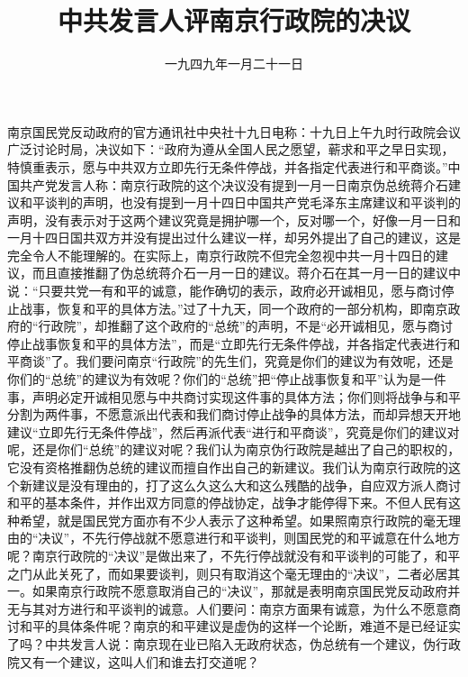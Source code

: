 
\title{中共发言人评南京行政院的决议}
\date{一九四九年一月二十一日}
\maketitle


南京国民党反动政府的官方通讯社中央社十九日电称：十九日上午九时行政院会议广泛讨论时局，决议如下：“政府为遵从全国人民之愿望，蕲求和平之早日实现，特慎重表示，愿与中共双方立即先行无条件停战，并各指定代表进行和平商谈。”中国共产党发言人称：南京行政院的这个决议没有提到一月一日南京伪总统蒋介石建议和平谈判的声明，也没有提到一月十四日中国共产党毛泽东主席建议和平谈判的声明，没有表示对于这两个建议究竟是拥护哪一个，反对哪一个，好像一月一日和一月十四日国共双方并没有提出过什么建议一样，却另外提出了自己的建议，这是完全令人不能理解的。在实际上，南京行政院不但完全忽视中共一月十四日的建议，而且直接推翻了伪总统蒋介石一月一日的建议。蒋介石在其一月一日的建议中说：“只要共党一有和平的诚意，能作确切的表示，政府必开诚相见，愿与商讨停止战事，恢复和平的具体方法。”过了十九天，同一个政府的一部分机构，即南京政府的“行政院”，却推翻了这个政府的“总统”的声明，不是“必开诚相见，愿与商讨停止战事恢复和平的具体方法”，而是“立即先行无条件停战，并各指定代表进行和平商谈”了。我们要问南京“行政院”的先生们，究竟是你们的建议为有效呢，还是你们的“总统”的建议为有效呢？你们的“总统”把“停止战事恢复和平”认为是一件事，声明必定开诚相见愿与中共商讨实现这件事的具体方法；你们则将战争与和平分割为两件事，不愿意派出代表和我们商讨停止战争的具体方法，而却异想天开地建议“立即先行无条件停战”，然后再派代表“进行和平商谈”，究竟是你们的建议对呢，还是你们“总统”的建议对呢？我们认为南京伪行政院是越出了自己的职权的，它没有资格推翻伪总统的建议而擅自作出自己的新建议。我们认为南京行政院的这个新建议是没有理由的，打了这么久这么大和这么残酷的战争，自应双方派人商讨和平的基本条件，并作出双方同意的停战协定，战争才能停得下来。不但人民有这种希望，就是国民党方面亦有不少人表示了这种希望。如果照南京行政院的毫无理由的“决议”，不先行停战就不愿意进行和平谈判，则国民党的和平诚意在什么地方呢？南京行政院的“决议”是做出来了，不先行停战就没有和平谈判的可能了，和平之门从此关死了，而如果要谈判，则只有取消这个毫无理由的“决议”，二者必居其一。如果南京行政院不愿意取消自己的“决议”，那就是表明南京国民党反动政府并无与其对方进行和平谈判的诚意。人们要问：南京方面果有诚意，为什么不愿意商讨和平的具体条件呢？南京的和平建议是虚伪的这样一个论断，难道不是已经证实了吗？中共发言人说：南京现在业已陷入无政府状态，伪总统有一个建议，伪行政院又有一个建议，这叫人们和谁去打交道呢？
